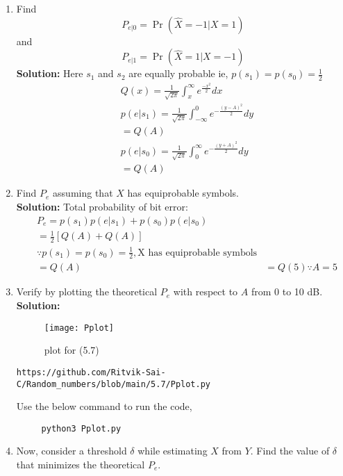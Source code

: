 \documentclass[journal,12pt,twocolumn]{IEEEtran}
\renewcommand\thesection{\arabic{section}}
\providecommand{\pr}[1]{\ensuremath{\Pr\left(#1\right)}}
\theoremstyle{remark}
\newcommand{\solution}{\noindent \textbf{Solution: }}
\numberwithin{equation}{section}
\begin{document}
\begin{enumerate}[label=\thesection.\arabic*
,ref=\thesection.\theenumi]
\begin{align}
y>0 \implies s_1\\
y\leq 0 \implies s_0
\end{align}
\item
\label{ml-ch4_sim}
Find 
\begin{equation}
	P_{e|0} = \pr{\hat{X} = -1|X=1}
\end{equation}
and 
\begin{equation}
	P_{e|1} = \pr{\hat{X} = 1|X=-1}
\end{equation}
\solution 
Here $s_1$ and $s_2$ are equally probable ie, $p(s_1)=p(s_0)=\frac{1}{2}$ \\
\begin{align}
&Q(x)=\frac{1}{\sqrt{2\pi}} \int_{x}^{\infty} e^{\frac{-x^{2}}{2} } dx\\
&p(e|s_1)=\frac{1}{\sqrt{2 \pi}} \int_{-\infty}^{0} e^{-\frac{(y-A)^2}{2}} dy
\nonumber \\
&=Q(A)\\
&p(e|s_0)=\frac{1}{\sqrt{2 \pi}} \int_{0}^{\infty} e^{-\frac{(y+A)^{2}}{2}} dy
\nonumber \\
&=Q(A)
\end{align}
%
\item Find $P_e$ assuming that $X$ has equiprobable symbols.\\
\solution
Total probability of bit error:
\begin{align}
&P_{e}=p(s_1)p(e|s_1)+p(s_0)p(e|s_0)\\
&=\frac{1}{2}[Q(A)+Q(A)]\\
&\because p(s_1)=p(s_0)=\frac{1}{2},\text{X has equiprobable symbols}\\
\nonumber
&=Q(A)
&=Q(5) \because A=5
\end{align}
%
\item
Verify by plotting  the theoretical $P_e$ with respect to $A$ from 0 to 10 dB. \\
\solution
\begin{figure}[!ht]
\texttt{[image: Pplot]}
\caption{plot for (5.7)}
\label{fig:Plt}
\end{figure}
	\begin{lstlisting}
https://github.com/Ritvik-Sai-C/Random_numbers/blob/main/5.7/Pplot.py
	\end{lstlisting}
	Use the below command to run the code,
	\begin{lstlisting}
     python3 Pplot.py 
	\end{lstlisting}
\item Now, consider a threshold $\delta$  while estimating $X$ from $Y$. Find the value of $\delta$ that minimizes the theoretical $P_e$.\\

\end{enumerate}
\end{document}
